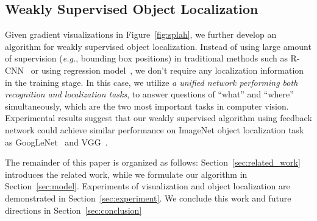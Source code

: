 
\subsection{Weakly Supervised Object Localization}
Given gradient visualizations in Figure~\ref{fig:splah}, we further develop an algorithm for weakly supervised object localization. Instead of using large amount of supervision (\emph{e.g.}, bounding box positions) in traditional methods such as R-CNN~\cite{girshick2014rich} or using regression model~\cite{erhan2014scalable, Simonyan2014Very}, we don't require any localization information in the training stage. In this case, we utilize \emph{a unified network performing both recognition and localization tasks}, to answer questions of ``what'' and ``where'' simultaneously, which are the two most important tasks in computer vision. Experimental results suggest that our weakly supervised algorithm using feedback network could achieve similar performance on ImageNet object localization task as GoogLeNet~\cite{Szegedy2014Going} and VGG~\cite{Simonyan2014Very}.

The remainder of this paper is organized as follows: Section~\ref{sec:related_work} introduces the related work, while we formulate our algorithm in Section~\ref{sec:model}. Experiments of visualization and object localization are demonstrated in Section~\ref{sec:experiment}. We conclude this work and future directions in Section~\ref{sec:conclusion}




